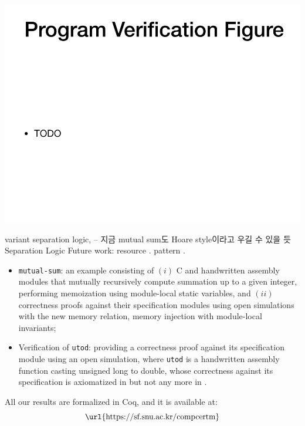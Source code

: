 


\includegraphics[width=1\linewidth]{fig-program-verif.png}


variant separation logic, -- 지금 mutual sum도 Hoare style이라고 우길 수 있을 듯
Separation Logic
Future work: resource . pattern .

\begin{itemize}
\item \texttt{mutual-sum}: an example consisting of $(i)$ C and
  handwritten assembly modules that mutually recursively compute
  summation up to a given integer, performing memoization using
  module-local static variables, and $(ii)$ correctness proofs
  against their specification modules using open simulations with the
  new memory relation, memory injection with module-local invariants;
\item Verification of \texttt{utod}: providing a correctness proof
  against its specification module using an open simulation,
  where \texttt{utod} is a handwritten
  assembly function casting unsigned long to double, whose correctness
  against its specification is axiomatized in \cc{} but not any more
  in \ccm{}.
\end{itemize}
\medskip

\lipsum[1-2]

\bigskip
All our results are formalized in Coq, and it is available at: \[ \text{\url{https://sf.snu.ac.kr/compcertm}} \]


